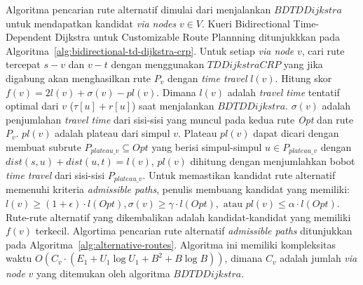 Algoritma pencarian rute alternatif dimulai dari menjalankan $BDTDDijkstra$ untuk mendapatkan kandidat \textit{via nodes} $v\in V$. Kueri Bidirectional Time-Dependent Dijkstra untuk Customizable Route Plannning ditunjukkkan pada Algoritma~\ref{alg:bidirectional-td-dijkstra-crp}. Untuk setiap \textit{via node} $v$, cari rute tercepat $s-v$ dan $v-t$ dengan menggunakan $TDDijkstraCRP$ yang jika digabung akan menghasilkan rute $P_v$ dengan \textit{time travel} $l(v)$. Hitung skor $f(v)=2l(v)+\sigma(v)-pl(v)$. Dimana $l(v)$ adalah \textit{travel time } tentatif optimal dari $v$  ($\tau[u]+r[u]$) saat menjalankan $BDTDDijkstra$. $\sigma(v)$ adalah penjumlahan \textit{travel time} dari sisi-sisi yang muncul pada kedua rute \textit{Opt} dan rute $P_v$. $pl(v)$ adalah plateau dari simpul $v$. Plateau $pl(v)$ dapat dicari dengan membuat subrute $P_{plateau\_v}\subseteq Opt$ yang berisi simpul-simpul $u\in P_{plateau\_v}$ dengan $dist(s,u)+dist(u,t)=l(v)$, $pl(v)$ dihitung dengan menjumlahkan bobot \textit{time travel} dari sisi-sisi $P_{plateau\_v}$. Untuk memastikan kandidat rute alternatif memenuhi kriteria \textit{admissible paths}, penulis membuang kandidat yang memiliki: $l(v)\geq (1+\epsilon)\cdot l(Opt), \sigma(v)\geq\gamma \cdot l(Opt), \text{ atau } pl(v)\leq \alpha \cdot l(Opt)$. Rute-rute alternatif yang dikembalikan adalah kandidat-kandidat yang memiliki $f(v)$ terkecil. Algortima pencarian rute alternatif \textit{admissible paths} ditunjukkan pada Algoritma~\ref{alg:alternative-routes}. Algoritma ini memiliki kompleksitas waktu $O(C_v\cdot (E_1+U_1\log U_1+B^{2}+B \log B))$, dimana $C_v$ adalah jumlah \textit{via node} $v$ yang ditemukan oleh algoritma $BDTDDijkstra$.


